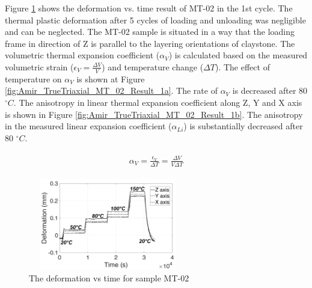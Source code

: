  Figure \ref{fig:Amir_TrueTriaxial_MT_02_Result} shows the deformation vs. time result of MT-02 in the 1st cycle. The thermal plastic deformation after 5 cycles of loading and unloading was negligible and can be neglected. The MT-02 sample is situated in a way that the loading frame in direction of Z is parallel to the layering orientations of claystone. The volumetric thermal expansion coefficient ($\alpha_V$) is calculated based on the measured volumetric strain ($\epsilon_V=\frac{\Delta V}{V}$) and temperature change ($\Delta T$). The effect of temperature on $\alpha_V$ is shown at Figure \ref{fig:Amir_TrueTriaxial_MT_02_Result_1a}. The rate of $\alpha_V$ is decreased after 80 $^{\circ}C$. The anisotropy in linear thermal expansion coefficient along Z, Y and X axis is shown in Figure \ref{fig:Amir_TrueTriaxial_MT_02_Result_1b}. The anisotropy in the measured linear expansion coefficient ($\alpha_{Li}$) is substantially decreased after 80 $^{\circ}C$.

\begin{align}
\label{eq:ThermalExpansion}
\begin{split}
\alpha_V=\frac{\epsilon_V}{\Delta T}=\frac{\Delta V}{V\Delta T}
\end{split}
\end{align}

\begin{figure}[!ht]
\centering
\includegraphics[width=7cm,height=4cm]{figures/Amir_TrueTriaxial_MT_02_Result.png}
\caption{The deformation vs time for sample MT-02}
\label{fig:Amir_TrueTriaxial_MT_02_Result}
\end{figure} 

